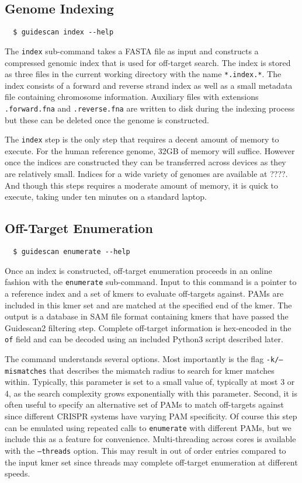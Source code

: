 \documentclass[11pt]{article}
\begin{document}
\subsection{Genome Indexing}

\begin{verbatim}
  $ guidescan index --help
\end{verbatim}

The \texttt{index} sub-command takes a FASTA file as input and
constructs a compressed genomic index that is used for off-target
search. The index is stored as three files in the current working
directory with the name \texttt{*.index.*}. The index
consists of a forward and reverse strand index as well as a small
metadata file containing chromosome information. Auxiliary files with
extensions \texttt{.forward.fna} and \texttt{.reverse.fna} are written
to disk during the indexing process but these can be deleted once the
genome is constructed.

The \texttt{index} step is the only step that requires a decent amount
of memory to execute. For the human reference genome, 32GB of memory
will suffice. However once the indices are constructed they can be
transferred across devices as they are relatively small. Indices for a
wide variety of genomes are available at ????. And though this steps
requires a moderate amount of memory, it is quick to execute, taking
under ten minutes on a standard laptop.

\subsection{Off-Target Enumeration}
\begin{verbatim}
  $ guidescan enumerate --help
\end{verbatim}

Once an index is constructed, off-target enumeration proceeds in an
online fashion with the \texttt{enumerate} sub-command. Input to this
command is a pointer to a reference index and a set of kmers to
evaluate off-targets against. PAMs are included in this kmer set and
are matched at the specified end of the kmer. The output is a database
in SAM file format containing kmers that have passed the Guidescan2
filtering step. Complete off-target information is hex-encoded in the
\texttt{of} field and can be decoded using an included Python3 script
described later.

The command understands several options. Most importantly is the flag
\texttt{-k/--mismatches} that describes the mismatch radius to search
for kmer matches within. Typically, this parameter is set to a small
value of, typically at most 3 or 4, as the search complexity grows
exponentially with this parameter. Second, it is often useful to
specify an alternative set of PAMs to match off-targets against since
different CRISPR systems have varying PAM specificity. Of course this
step can be emulated using repeated calls to \texttt{enumerate} with
different PAMs, but we include this as a feature for
convenience. Multi-threading across cores is available with the
\texttt{--threads} option. This may result in out of order entries
compared to the input kmer set since threads may complete off-target
enumeration at different speeds.
\end{document}
